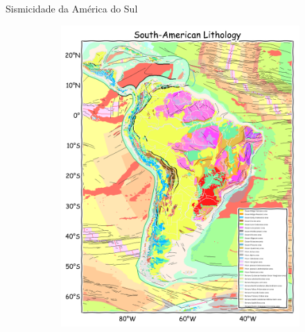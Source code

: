 \documentclass[ucs,8pt]{beamer}
\begin{document}
\begin{frame}{Sismicidade da América do Sul}
\begin{figure}[H]
	\centering
	\begin{subfigure}[t]{0.48\textwidth}
	  \centering
	  \includegraphics[width=.85\textwidth]{lithology_sa} 
	  \label{fig:sa_tec} 
	\end{subfigure}
	\quad %
	\begin{subfigure}[t]{0.48\textwidth}
	  \centering

\end{subfigure}
\end{figure}
\end{frame}
\end{document}
